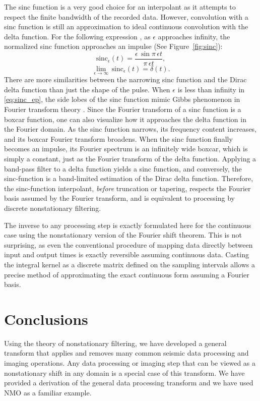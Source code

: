 The sinc function is a very good choice for an interpolant as it attempts to respect the finite bandwidth of the recorded data.
However, convolution with a sinc function is still an approximation to ideal continuous convolution with the delta function.
For the following expression \citep{elliott_rao82}, as $\epsilon$ approaches infinity, the normalized sinc function approaches an impulse (See Figure~\ref{fig:sinc}):
\begin{equation}
	\label{eq:sinc_ep}
	\mbox{sinc}_{\epsilon} \left( t \right) = \frac{\epsilon \, \sin{\pi \, \epsilon t}}{\pi \, \epsilon t},
\end{equation} 
\begin{equation}
	\label{eq:delta_sinc}
	\lim_{\epsilon \to \infty} \, \mbox{sinc}_{\epsilon} \left( t \right) = \delta \left( t \right).
\end{equation} 
There are more similarities between the narrowing sinc function and the Dirac delta function than just the shape of the pulse.
When $\epsilon$ is less than infinity in \ref{eq:sinc_ep}, the side lobes of the sinc function mimic Gibbs phenomenon in Fourier transform theory \citep{papoulis62}.
Since the Fourier transform of a sinc function is a boxcar function, one can also visualize how it approaches the delta function in the Fourier domain.
As the sinc function narrows, its frequency content increases, and its boxcar Fourier transform broadens.
When the sinc function finally becomes an impulse, its Fourier spectrum is an infinitely wide boxcar, which is simply a constant, just as the Fourier transform of the delta function.
Applying a band-pass filter to a delta function yields a sinc function, and conversely, the sinc-function is a band-limited estimation of the Dirac delta function.
Therefore, the sinc-function interpolant, \textit{before} truncation or tapering, respects the Fourier basis assumed by the Fourier transform, and is equivalent to processing by discrete nonstationary filtering.
  
The inverse to any processing step is exactly formulated here for the continuous case using the nonstationary version of the Fourier shift theorem.
This is not surprising, as even the conventional procedure of mapping data directly between input and output times is exactly reversible assuming continuous data.
Casting the integral kernel as a discrete matrix defined on the sampling intervals allows a precise method of approximating the exact continuous form assuming a Fourier basis.

\section{Conclusions}
Using the theory of nonstationary filtering, we have developed a general transform that applies and removes many common seismic data processing and imaging operations.  
Any data processing or imaging step that can be viewed as a nonstationary shift in any domain is a special case of this transform.  
We have provided a derivation of the general data processing transform and we have used NMO as a familiar example.

